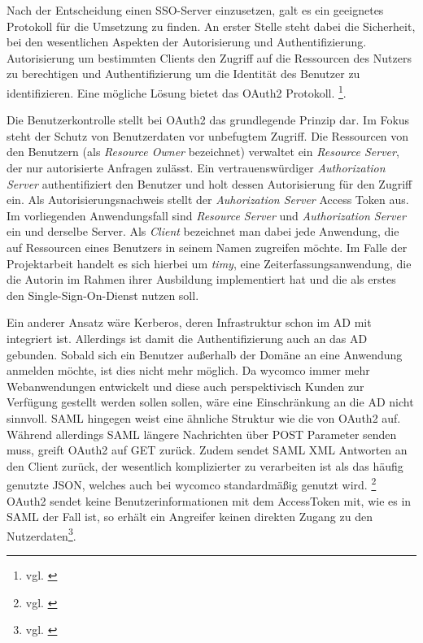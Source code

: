 Nach der Entscheidung einen \ac{SSO}-Server einzusetzen, galt es ein geeignetes Protokoll für die Umsetzung zu finden. An erster Stelle steht dabei die Sicherheit, bei den wesentlichen Aspekten der Autorisierung und Authentifizierung. Autorisierung um bestimmten Clients den Zugriff auf die Ressourcen des Nutzers zu berechtigen und Authentifizierung um die Identität des Benutzer zu identifizieren. Eine mögliche Lösung bietet das OAuth2 Protokoll. \footnote{vgl. \cite{OAuth2}}.

Die Benutzerkontrolle stellt bei OAuth2 das grundlegende Prinzip dar. Im Fokus steht der Schutz von Benutzerdaten vor unbefugtem Zugriff. Die Ressourcen von den Benutzern (als \textit{Resource Owner} bezeichnet) verwaltet ein \textit{Resource Server}, der nur autorisierte Anfragen zulässt. Ein vertrauenswürdiger \textit{Authorization Server} authentifiziert den Benutzer und holt dessen Autorisierung für den Zugriff ein. Als Autorisierungsnachweis stellt der \textit{Auhorization Server} Access Token aus. Im vorliegenden Anwendungsfall sind \textit{Resource Server} und \textit{Authorization Server} ein und derselbe Server.
Als \textit{Client} bezeichnet man dabei jede Anwendung, die auf Ressourcen eines Benutzers in seinem Namen zugreifen möchte. Im Falle der Projektarbeit handelt es sich hierbei um \textit{timy}, eine Zeiterfassungsanwendung, die die Autorin im Rahmen ihrer Ausbildung implementiert hat und die als erstes den Single-Sign-On-Dienst nutzen soll. 

Ein anderer Ansatz wäre Kerberos, deren Infrastruktur schon im \ac{AD} mit integriert ist. Allerdings ist damit die Authentifizierung auch an das \ac{AD} gebunden. Sobald sich ein Benutzer außerhalb der Domäne an eine Anwendung anmelden möchte, ist dies nicht mehr möglich. Da wycomco immer mehr Webanwendungen entwickelt und diese auch perspektivisch Kunden zur Verfügung gestellt werden sollen sollen, wäre eine Einschränkung an die AD nicht sinnvoll. 
\acs{SAML} hingegen weist eine ähnliche Struktur wie die von OAuth2 auf. Während allerdings SAML längere Nachrichten über POST Parameter senden muss, greift OAuth2 auf GET zurück. Zudem sendet SAML \acs{XML} Antworten an den Client zurück, der wesentlich komplizierter zu verarbeiten ist als das häufig genutzte \acs{JSON}, welches auch bei wycomco standardmäßig genutzt wird. \footnote{vgl. \cite{SSO-Vgl}}
OAuth2 sendet keine Benutzerinformationen mit dem AccessToken mit, wie es in SAML der Fall ist, so erhält ein Angreifer keinen direkten Zugang zu den Nutzerdaten\footnote{vgl. \cite{book}}.


